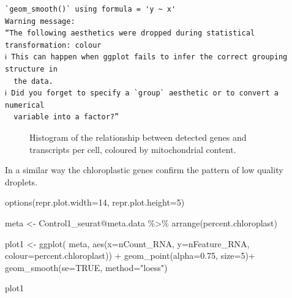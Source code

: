 \documentclass[
  letterpaper,
  DIV=11,
  numbers=noendperiod]{scrartcl}
\newenvironment{Shaded}{\begin{snugshade}}{\end{snugshade}}
\newcommand{\AttributeTok}[1]{\textcolor[rgb]{0.40,0.45,0.13}{#1}}
\newcommand{\ConstantTok}[1]{\textcolor[rgb]{0.56,0.35,0.01}{#1}}
\newcommand{\DecValTok}[1]{\textcolor[rgb]{0.68,0.00,0.00}{#1}}
\newcommand{\FloatTok}[1]{\textcolor[rgb]{0.68,0.00,0.00}{#1}}
\newcommand{\FunctionTok}[1]{\textcolor[rgb]{0.28,0.35,0.67}{#1}}
\newcommand{\NormalTok}[1]{\textcolor[rgb]{0.00,0.23,0.31}{#1}}
\newcommand{\OtherTok}[1]{\textcolor[rgb]{0.00,0.23,0.31}{#1}}
\newcommand{\SpecialCharTok}[1]{\textcolor[rgb]{0.37,0.37,0.37}{#1}}
\newcommand{\StringTok}[1]{\textcolor[rgb]{0.13,0.47,0.30}{#1}}
\begin{document}
\begin{verbatim}
`geom_smooth()` using formula = 'y ~ x'
Warning message:
“The following aesthetics were dropped during statistical transformation: colour
ℹ This can happen when ggplot fails to infer the correct grouping structure in
  the data.
ℹ Did you forget to specify a `group` aesthetic or to convert a numerical
  variable into a factor?”
\end{verbatim}

\begin{figure}[H]


\caption{\label{fig-gentra}Histogram of the relationship between
detected genes and transcripts per cell, coloured by mitochondrial
content.}

\end{figure}%

In a similar way the chloroplastic genes confirm the pattern of low
quality droplets.

\begin{Shaded}
\begin{Highlighting}[]
\FunctionTok{options}\NormalTok{(}\AttributeTok{repr.plot.width=}\DecValTok{14}\NormalTok{, }\AttributeTok{repr.plot.height=}\DecValTok{5}\NormalTok{)}

\NormalTok{meta }\OtherTok{\textless{}{-}}\NormalTok{ Control1\_seurat}\SpecialCharTok{@}\NormalTok{meta.data }\SpecialCharTok{\%\textgreater{}\%} \FunctionTok{arrange}\NormalTok{(percent.chloroplast)}

\NormalTok{plot1 }\OtherTok{\textless{}{-}} \FunctionTok{ggplot}\NormalTok{( meta, }\FunctionTok{aes}\NormalTok{(}\AttributeTok{x=}\NormalTok{nCount\_RNA, }\AttributeTok{y=}\NormalTok{nFeature\_RNA, }\AttributeTok{colour=}\NormalTok{percent.chloroplast)) }\SpecialCharTok{+} 
         \FunctionTok{geom\_point}\NormalTok{(}\AttributeTok{alpha=}\FloatTok{0.75}\NormalTok{, }\AttributeTok{size=}\DecValTok{5}\NormalTok{)}\SpecialCharTok{+}
         \FunctionTok{geom\_smooth}\NormalTok{(}\AttributeTok{se=}\ConstantTok{TRUE}\NormalTok{, }\AttributeTok{method=}\StringTok{"loess"}\NormalTok{)}

\NormalTok{plot1}
\end{Highlighting}
\end{Shaded}
\end{document}
